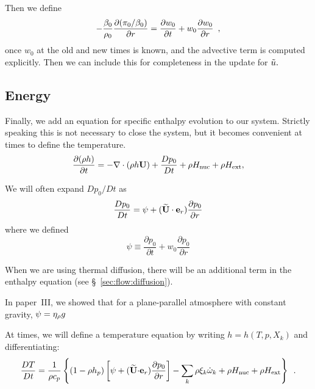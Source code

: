 Then we define 
\begin{equation}
- \frac{\beta_0}{\rho_0} \frac{\partial (\pi_0/\beta_0)}{\partial r} = \frac{\partial w_0}{\partial t} + 
   w_0 \frac{\partial w_0}{\partial r} \enskip, \label{eq:pizero}
\end{equation}
once $w_0$ at the old and new times is known, and the advective term is computed explicitly.
Then we can include this for completeness in the update for $\tilde{u}.$




\subsection{Energy}

Finally, we add an equation for specific enthalpy evolution to our
system.  Strictly speaking this is not necessary to close the system,
but it becomes convenient at times to define the temperature.
\begin{equation}
\frac{\partial(\rho h)}{\partial t} = 
   -\nabla\cdot(\rho h{\bf U}) + \frac{Dp_0}{Dt} + \rho{H_{\rm nuc}} + \rho{H_{\rm ext}},\label{eq:flow:enthalpy}
\end{equation}

We will often expand $Dp_0/Dt$ as
\begin{equation}
\frac{Dp_0}{Dt} = \psi + (\widetilde{{\bf U}} \cdot \mathbf{e}_r) \frac{\partial p_0}{\partial r}
\end{equation}
where we defined
\begin{equation}
\psi \equiv \frac{\partial p_0}{\partial t} + w_0 \frac{\partial p_0}{\partial r}
\end{equation}

When we are using thermal diffusion, there will be an additional term in
the enthalpy equation (see \S~\ref{sec:flow:diffusion}).

In paper~III, we showed that for a plane-parallel atmosphere with
constant gravity, $\psi = \eta_{\rho} g$


At times, we will define a temperature equation by writing $h = h(T,p,X_k)$
and differentiating:
\begin{equation}
\label{eq:flow:temp}
\frac{DT}{Dt} = \frac{1}{\rho c_p} \left\{ \left(1 - \rho h_p\right) \left 
  [ \psi + (\widetilde{{\bf U}} \mathbf{\cdot} \mathbf{e}_r) \frac{\partial p_0}{\partial r} \right ]
 - \sum_k \rho \xi_k {\dot{\omega}}_k
 + \rho {H_{\rm nuc}} + \rho {H_{\rm ext}} \right \} \enskip  .
\end{equation}

